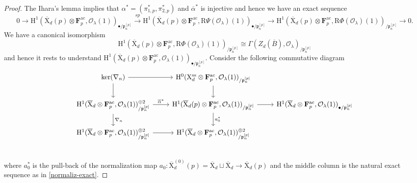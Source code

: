 \documentclass[10pt]{amsart}
\numberwithin{equation}{section}
\theoremstyle{plain}
\numberwithin{equation}{section}
\theoremstyle{definition}
\theoremstyle{remark}
\def\ac{\mathrm{ac}}
\def\ss{\mathrm{ss}}
\def\ac{\mathrm{ac}}
\def\calO{\mathcal{O}}
\def\frakp{\mathfrak{p}}
\def\FF{\mathbf{F}}
\def\rmH{\mathrm{H}}
\def\rmX{\mathrm{X}}
\def\rmR{\mathrm{R}}
\begin{document}
\begin{proof}
The Ihara's lemma implies that  $\alpha^{\ast}=(\pi^{\ast}_{1,p}, \pi^{\ast}_{2,p})$ and $\overline{\alpha}^{\ast}$ is injective and hence we have an exact sequence
\begin{equation*}
0\rightarrow \rmH^{1}(\overline{\rmX}_{d}(p)\otimes{\FF^{\ac}_{p}}, \calO_{\lambda}(1))_{\bullet/\frakp^{[p]}_{n}} \xrightarrow{sp} \rmH^{1}(\overline{\rmX}_{d}(p)\otimes{\FF^{\ac}_{p}}, \rmR\Psi(\calO_{\lambda})(1))_{\bullet/\frakp^{[p]}_{n}} \rightarrow \rmH^{1}(\overline{\rmX}_{d}(p)\otimes{\FF^{\ac}_{p}}, \rmR\Phi(\calO_{\lambda})(1))_{/\frakp^{[p]}_{n}} \rightarrow 0.
\end{equation*}
We have a canonical isomorphism
\begin{equation*}
\rmH^{1}(\overline{\rmX}_{d}(p)\otimes{\FF^{\ac}_{p}}, \rmR\Phi(\calO_{\lambda})(1))_{/\frakp^{[p]}_{n}}\cong \Gamma(Z_{d}(\overline{B}), \calO_{\lambda})_{/\frakp^{[p]}_{n}} 
\end{equation*}
and hence it rests to understand $\rmH^{1}(\overline{\rmX}_{d}(p)\otimes{\FF^{\ac}_{p}}, \calO_{\lambda}(1))_{\bullet/\frakp^{[p]}_{n}}$.
Consider the following commutative diagram
\begin{equation*}
\begin{tikzcd}
\mathrm{ker}(\nabla_{n}) \arrow[r]\arrow[d]& \rmH^{0}(\rmX^{\ss}_{d}\otimes{\FF^{\ac}_{p}}, \calO_{\lambda}(1))_{/\frakp^{[p]}_{n}} \arrow[d]  \\
\rmH^{1}(\overline{\rmX}_{d}\otimes{\FF^{\ac}_{p}}, \calO_{\lambda}(1))^{\oplus 2}_{/\frakp^{[p]}_{n}} \arrow[r, "\overline{\alpha}^{\ast}"] \arrow[d, "\nabla_{n}"] & \rmH^{1}(\overline{\rmX}_{d}(p)\otimes{\FF^{\ac}_{p}}, \calO_{\lambda}(1))_{/\frakp^{[p]}_{n}} \arrow[r] \arrow[d, "a^{\ast}_{0}"] & \rmH^{1}(\overline{\rmX}_{d}\otimes{\FF^{\ac}_{p}}, \calO_{\lambda}(1))_{\bullet/\frakp^{[p]}_{n}}\\
\rmH^{1}(\overline{\rmX}_{d}\otimes{\FF^{\ac}_{p}}, \calO_{\lambda}(1))^{\oplus 2}_{/\frakp^{[p]}_{n}} \arrow[r]  & \rmH^{1}(\overline{\rmX}_{d}\otimes{\FF^{\ac}_{p}}, \calO_{\lambda}(1))^{\oplus 2}_{/\frakp^{[p]}_{n}}  \\  
\end{tikzcd}
\end{equation*}
where $a^{\ast}_{0}$ is the pull-back of the normalization map $a_{0}:\overline{\rmX}^{(0)}_{d}(p)=\overline{\rmX}_{d}\sqcup\overline{\rmX}_{d}\rightarrow \overline{\rmX}_{d}(p)$ and the middle column is the natural exact sequence as in \ref{normaliz-exact}.


\end{proof}
\end{document}
